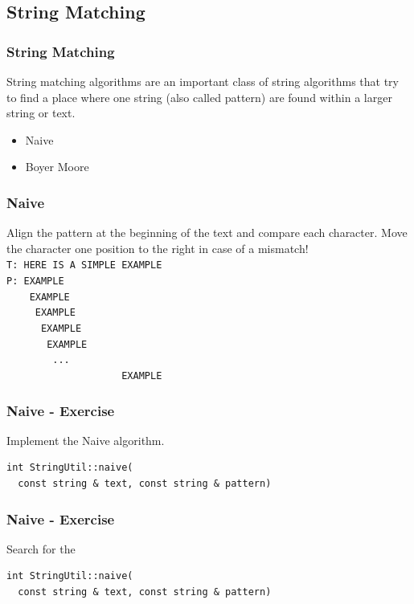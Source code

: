 \subsection{String Matching}

\begin{frame}[fragile] 
  \frametitle{String Matching}
  String matching algorithms are an important class of string algorithms that try
  to find a place where one string (also called pattern) are found within a larger
  string or text.
  \vspace{3mm}
  \begin{itemize}
  \item Naive
  \item Boyer Moore
  \end{itemize}
\end{frame}

\begin{frame}[fragile] 
  \frametitle{Naive}
  Align the pattern at the beginning of the text and compare each character.
  Move the character one position to the right in case of a mismatch!\\
  \vspace{3mm}
  {\small
  \verb|T: HERE IS A SIMPLE EXAMPLE|\\
  \verb|P: EXAMPLE|\\
  \verb|    EXAMPLE|\\
  \verb|     EXAMPLE|\\
  \verb|      EXAMPLE|\\
  \verb|       EXAMPLE|\\
  \verb|        ...|\\
  \verb|                    EXAMPLE|\\
  }
\end{frame}

\begin{frame}[fragile] 
\frametitle{Naive - Exercise}
\begin{exercise}
Implement the Naive algorithm.
\begin{lstlisting}
int StringUtil::naive(
  const string & text, const string & pattern)
\end{lstlisting}
\end{exercise}
\end{frame}

\begin{frame}[fragile] 
\frametitle{Naive - Exercise}
\begin{exercise}
Search for the 
\begin{lstlisting}
int StringUtil::naive(
  const string & text, const string & pattern)
\end{lstlisting}
\end{exercise}
\end{frame}

